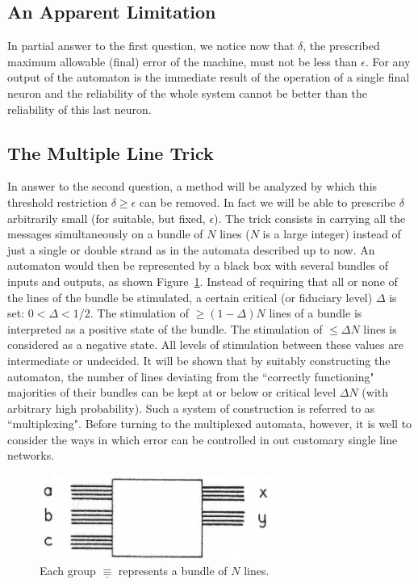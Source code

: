 \documentclass[twocolumn,preprintnumbers,amsmath,amssymb,floatfix]{revtex4}
\begin{document}
\subsection{\label{sec:seven3}An Apparent Limitation}

In partial answer to the first question, we notice now that
$\delta$, the prescribed maximum allowable (final) error of the
machine, must not be less than $\epsilon$. For any output of the
automaton is the immediate result of the operation of a single
final neuron and the reliability of the whole system cannot be
better than the reliability of this last neuron.

\subsection{\label{sec:seven4}The Multiple Line Trick}

In answer to the second question, a method will be analyzed by
which this threshold restriction $\delta\geq\epsilon$ can be
removed. In fact we will be able to prescribe $\delta$ arbitrarily
small (for suitable, but fixed, $\epsilon$). The trick consists in
carrying all the messages simultaneously on a bundle of $N$ lines
($N$ is a large integer) instead of just a single or double strand
as in the automata described up to now. An automaton would then be
represented by a black box with several bundles of inputs and
outputs, as shown Figure~\ref{fig:25}. Instead of requiring that
all or none of the lines of the bundle be stimulated, a certain
critical (or fiduciary level) $\Delta$ is set: $0<\Delta<1/2$. The
stimulation of $\geq(1-\Delta)N$ lines of a bundle is interpreted
as a positive state of the bundle. The stimulation of $\leq\Delta
N$ lines is considered as a negative state. All levels of
stimulation between these values are intermediate or undecided. It
will be shown that by suitably constructing the automaton, the
number of lines deviating from the ``correctly functioning"
majorities of their bundles can be kept at or below or critical
level $\Delta N$ (with arbitrary high probability). Such a system
of construction is referred to as ``multiplexing". Before turning
to the multiplexed automata, however, it is well to consider the
ways in which error can be controlled in out customary single line
networks.

\begin{figure}
\includegraphics[width=3in]{fig_25}
\caption{\label{fig:25}Each group $\underline{\equiv}$ represents
a bundle of $N$ lines.}
\end{figure}
\end{document}
